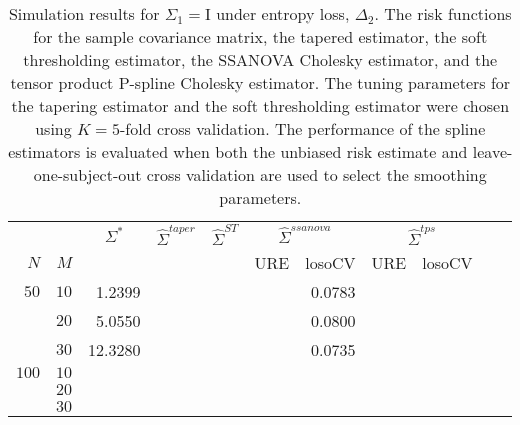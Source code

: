 \documentclass[12pt]{article}
\newcommand{\ra}[1]{\renewcommand{\arraystretch}{#1}}
\theoremstyle{definition}
\begin{document}
\begin{table}\centering
\ra{1.3}
\caption{Simulation results for $\Sigma_1 = \mathrm{I}$ under entropy loss, $\Delta_2$. The risk functions for the sample covariance matrix, the tapered estimator, the soft thresholding estimator, the SSANOVA Cholesky estimator, and the tensor product P-spline Cholesky estimator. The tuning parameters for the tapering estimator and the soft thresholding estimator were chosen using $K = 5$-fold cross validation. The performance of the spline estimators is evaluated when both the unbiased risk estimate and leave-one-subject-out cross validation are used to select the smoothing parameters.}
\begin{tabular}{@{}rrrcrcrrcrr@{}}\toprule
   &            & \multicolumn{1}{c}{$\Sigma^*$}  & \multicolumn{1}{c}{$\hat{\Sigma}^{taper}$} &\multicolumn{1}{c}{$\hat{\Sigma}^{ST}$} &\multicolumn{2}{c}{ $\hat{\Sigma}^{ssanova}$} &  \multicolumn{2}{c}{ $\hat{\Sigma}^{tps}$}\\
$N$ & $M$ 	&	  &	& & \multicolumn{1}{c}{\mbox{URE}} & \multicolumn{1}{c}{\mbox{losoCV}} &\multicolumn{1}{c}{\mbox{URE}} & \multicolumn{1}{c}{\mbox{losoCV}}\\ \midrule
$50$ & $10$ &	1.2399   &&&&   0.0783	&&\\
  & $20$  &    5.0550	&&&&   0.0800	&&\\
  & $30$   &    12.3280	&&&&   0.0735 &&\\ \midrule
$100$ & $10$ &&&&&&&\\
& $20$  &&&&&&& \\
& $30$  &&&&&&& \\
\bottomrule
\end{tabular}
\end{table}

\end{document}
